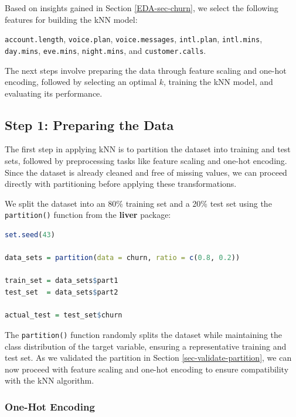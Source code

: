\documentclass[
]{book}
\newcommand{\passthrough}[1]{#1}
\theoremstyle{definition}
\theoremstyle{definition}
\theoremstyle{definition}
\theoremstyle{definition}
\theoremstyle{remark}
\begin{document}
Based on insights gained in Section \ref{EDA-sec-churn}, we select the following features for building the kNN model:

\passthrough{\lstinline!account.length!}, \passthrough{\lstinline!voice.plan!}, \passthrough{\lstinline!voice.messages!}, \passthrough{\lstinline!intl.plan!}, \passthrough{\lstinline!intl.mins!}, \passthrough{\lstinline!day.mins!}, \passthrough{\lstinline!eve.mins!}, \passthrough{\lstinline!night.mins!}, and \passthrough{\lstinline!customer.calls!}.

The next steps involve preparing the data through feature scaling and one-hot encoding, followed by selecting an optimal \(k\), training the kNN model, and evaluating its performance.

\subsection{Step 1: Preparing the Data}\label{step-1-preparing-the-data}

The first step in applying kNN is to partition the dataset into training and test sets, followed by preprocessing tasks like feature scaling and one-hot encoding. Since the dataset is already cleaned and free of missing values, we can proceed directly with partitioning before applying these transformations.

We split the dataset into an 80\% training set and a 20\% test set using the \passthrough{\lstinline!partition()!} function from the \textbf{liver} package:

\begin{lstlisting}[language=R]
set.seed(43)

data_sets = partition(data = churn, ratio = c(0.8, 0.2))

train_set = data_sets$part1
test_set  = data_sets$part2

actual_test = test_set$churn
\end{lstlisting}

The \passthrough{\lstinline!partition()!} function randomly splits the dataset while maintaining the class distribution of the target variable, ensuring a representative training and test set. As we validated the partition in Section \ref{sec-validate-partition}, we can now proceed with feature scaling and one-hot encoding to ensure compatibility with the kNN algorithm.

\subsubsection*{One-Hot Encoding}\label{one-hot-encoding-2}
\end{document}
